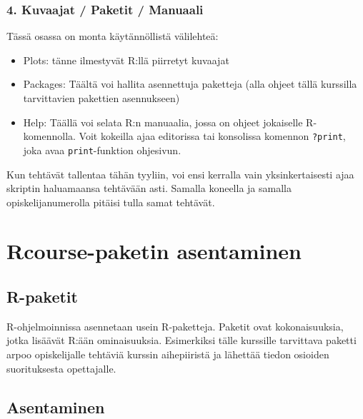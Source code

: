 \documentclass[
]{book}
\providecommand{\tightlist}{%
  \setlength{\itemsep}{0pt}\setlength{\parskip}{0pt}}
\begin{document}
\hypertarget{kuvaajat-paketit-manuaali}{%
\subsubsection*{4. Kuvaajat / Paketit / Manuaali}\label{kuvaajat-paketit-manuaali}}

Tässä osassa on monta käytännöllistä välilehteä:

\begin{itemize}
\tightlist
\item
  Plots: tänne ilmestyvät R:llä piirretyt kuvaajat
\item
  Packages: Täältä voi hallita asennettuja paketteja (alla ohjeet tällä kurssilla tarvittavien pakettien asennukseen)
\item
  Help: Täällä voi selata R:n manuaalia, jossa on ohjeet jokaiselle R-komennolla. Voit kokeilla ajaa editorissa tai konsolissa komennon \texttt{?print}, joka avaa \texttt{print}-funktion ohjesivun.
\end{itemize}

Kun tehtävät tallentaa tähän tyyliin, voi ensi kerralla vain yksinkertaisesti ajaa skriptin haluamaansa tehtävään asti. Samalla koneella ja samalla opiskelijanumerolla pitäisi tulla samat tehtävät.

\hypertarget{rcourse-paketin-asentaminen}{%
\section*{Rcourse-paketin asentaminen}\label{rcourse-paketin-asentaminen}}

\hypertarget{r-paketit}{%
\subsection*{R-paketit}\label{r-paketit}}

R-ohjelmoinnissa asennetaan usein R-paketteja. Paketit ovat kokonaisuuksia, jotka lisäävät R:ään ominaisuuksia. Esimerkiksi tälle kurssille tarvittava paketti arpoo opiskelijalle tehtäviä kurssin aihepiiristä ja lähettää tiedon osioiden suorituksesta opettajalle.

\hypertarget{asentaminen}{%
\subsection*{Asentaminen}\label{asentaminen}}
\end{document}
